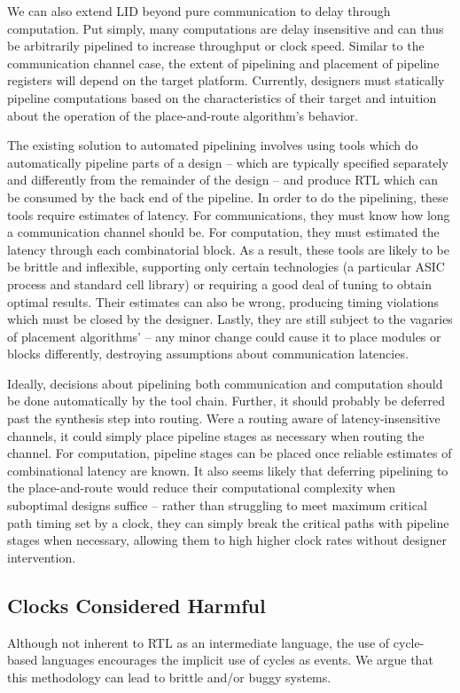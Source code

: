 We can also extend LID beyond pure communication to delay through computation.
Put simply, many computations are delay insensitive and can thus be
arbitrarily pipelined to increase throughput or clock speed. Similar to the
communication channel case, the extent of pipelining and placement of pipeline
registers will depend on the target platform. Currently, designers must
statically pipeline computations based on the characteristics of their target
and intuition about the operation of the place-and-route algorithm's behavior.

The existing solution to automated pipelining involves using tools which do
automatically pipeline parts of a design -- which are typically specified
separately and differently from the remainder of the design -- and produce RTL
which can be consumed by the back end of the pipeline. In order to do the
pipelining, these tools require estimates of latency. For communications, they
must know how long a communication channel should be. For computation, they
must estimated the latency through each combinatorial block. As a result,
these tools are likely to be be brittle and inflexible, supporting only
certain technologies (\eg a particular ASIC process and standard cell library)
or requiring a good deal of tuning to obtain optimal results. Their estimates
can also be wrong, producing timing violations which must be closed by the
designer. Lastly, they are still subject to the vagaries of placement
algorithms' -- any minor change could cause it to place modules or blocks
differently, destroying assumptions about communication latencies.

Ideally, decisions about pipelining both communication and computation should
be done automatically by the tool chain. Further, it should probably be
deferred past the synthesis step into routing. Were a routing aware of
latency-insensitive channels, it could simply place pipeline stages as
necessary when routing the channel. For computation, pipeline stages can be
placed once reliable estimates of combinational latency are known. It also
seems likely that deferring pipelining to the place-and-route would reduce
their computational complexity when suboptimal designs suffice -- rather than
struggling to meet maximum critical path timing set by a clock, they can
simply break the critical paths with pipeline stages when necessary, allowing
them to high higher clock rates without designer intervention.

\subsection{Clocks Considered Harmful}
Although not inherent to RTL as an intermediate language, the use of
cycle-based languages encourages the implicit use of cycles as events. We
argue that this methodology can lead to brittle and/or buggy systems.

